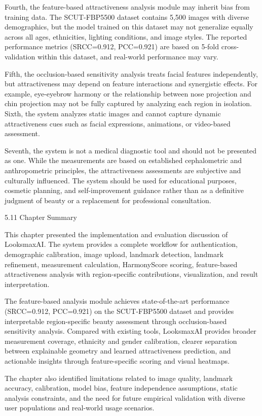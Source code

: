 Fourth, the feature-based attractiveness analysis module may inherit bias from training data. The SCUT-FBP5500 dataset contains 5,500 images with diverse demographics, but the model trained on this dataset may not generalize equally across all ages, ethnicities, lighting conditions, and image styles. The reported performance metrics (SRCC=0.912, PCC=0.921) are based on 5-fold cross-validation within this dataset, and real-world performance may vary.

Fifth, the occlusion-based sensitivity analysis treats facial features independently, but attractiveness may depend on feature interactions and synergistic effects. For example, eye-eyebrow harmony or the relationship between nose projection and chin projection may not be fully captured by analyzing each region in isolation. Sixth, the system analyzes static images and cannot capture dynamic attractiveness cues such as facial expressions, animations, or video-based assessment.

Seventh, the system is not a medical diagnostic tool and should not be presented as one. While the measurements are based on established cephalometric and anthropometric principles, the attractiveness assessments are subjective and culturally influenced. The system should be used for educational purposes, cosmetic planning, and self-improvement guidance rather than as a definitive judgment of beauty or a replacement for professional consultation.

5.11  Chapter Summary

This chapter presented the implementation and evaluation discussion of LooksmaxAI. The system provides a complete workflow for authentication, demographic calibration, image upload, landmark detection, landmark refinement, measurement calculation, HarmonyScore scoring, feature-based attractiveness analysis with region-specific contributions, visualization, and result interpretation. 

The feature-based analysis module achieves state-of-the-art performance (SRCC=0.912, PCC=0.921) on the SCUT-FBP5500 dataset and provides interpretable region-specific beauty assessment through occlusion-based sensitivity analysis. Compared with existing tools, LooksmaxAI provides broader measurement coverage, ethnicity and gender calibration, clearer separation between explainable geometry and learned attractiveness prediction, and actionable insights through feature-specific scoring and visual heatmaps.

The chapter also identified limitations related to image quality, landmark accuracy, calibration, model bias, feature independence assumptions, static analysis constraints, and the need for future empirical validation with diverse user populations and real-world usage scenarios.
